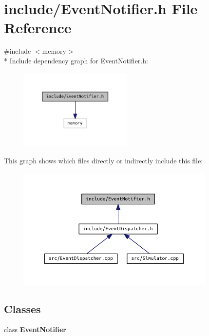 \section{include/\+Event\+Notifier.h File Reference}
\label{_event_notifier_8h}
{\ttfamily \#include $<$memory$>$}\\*
Include dependency graph for Event\+Notifier.\+h\+:
\nopagebreak
\begin{figure}[H]
\begin{center}
\leavevmode
\includegraphics[width=160pt]{_event_notifier_8h__incl}
\end{center}
\end{figure}
This graph shows which files directly or indirectly include this file\+:
\nopagebreak
\begin{figure}[H]
\begin{center}
\leavevmode
\includegraphics[width=280pt]{_event_notifier_8h__dep__incl}
\end{center}
\end{figure}
\subsection*{Classes}
\begin{DoxyCompactItemize}
\item 
class {\bf Event\+Notifier}
\end{DoxyCompactItemize}
